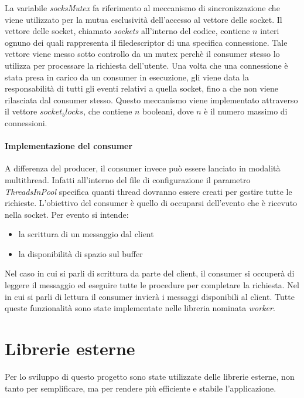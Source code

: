 \documentclass[]{article}
\begin{document}
La variabile \textit{socksMutex} fa riferimento al meccanismo di sincronizzazione
che viene utilizzato per la mutua esclusivit\`a dell'accesso al vettore delle socket.
Il vettore delle socket, chiamato \textit{sockets} all'interno del codice, contiene
$n$ interi ognuno dei quali rappresenta il filedescriptor di una specifica connessione.
Tale vettore viene messo sotto controllo da un mutex perch\`e il consumer stesso lo utilizza
per processare la richiesta dell'utente.
Una volta che una connessione \`e stata presa in carico da un consumer in esecuzione,
gli viene data la responsabilit\`a di tutti gli eventi relativi a quella socket, fino a
che non viene rilasciata dal consumer stesso.
Questo meccanismo viene implementato attraverso il vettore $socket_blocks$, che contiene
$n$ booleani, dove $n$ \`e il numero massimo di connessioni.

\paragraph{Implementazione del consumer}
A differenza del producer, il consumer invece pu\`o essere lanciato in modalit\`a multithread.
Infatti all'interno del file di configurazione il parametro \textit{ThreadsInPool} specifica
quanti thread dovranno essere creati per gestire tutte le richieste.
L'obiettivo del consumer \`e quello di occuparsi dell'evento che \`e ricevuto nella socket.
Per evento si intende:
\begin{itemize}
	\item la scrittura di un messaggio dal client
	\item la disponibilit\`a di spazio sul buffer
\end{itemize}
Nel caso in cui si parli di scrittura da parte del client, il consumer si occuper\`a di leggere
il messaggio ed eseguire tutte le procedure per completare la richiesta.
Nel in cui si parli di lettura il consumer invierà i messaggi disponibili al client.
Tutte queste funzionalit\`a sono state implementate nelle libreria nominata \textit{worker}.

\section{Librerie esterne}
Per lo sviluppo di questo progetto sono state utilizzate delle librerie esterne, non tanto per semplificare, ma per rendere
pi\`u efficiente e stabile l'applicazione.
\end{document}

